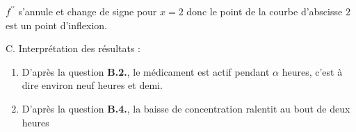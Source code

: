 \begin{corrige}
\begin{enumerate}
          \par
          $f^{\prime\prime}$ s'annule et change de signe pour $x=2$ donc le point de la courbe d'abscisse $2$ est un point d'inflexion.
     \end{enumerate}
     \begin{h3}C. Interprétation des résultats :\end{h3}
     \begin{enumerate}
          \item
          D'après la question \textbf{B.2.}, le médicament est actif pendant $\alpha $ heures, c'est à dire environ neuf heures et demi.
          \item
          D'après la question \textbf{B.4.}, la baisse de concentration ralentit au bout de deux heures
     \end{enumerate}
\end{corrige}
